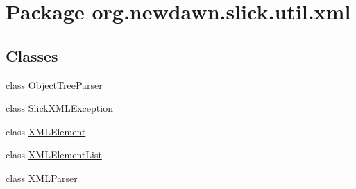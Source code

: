 \hypertarget{namespaceorg_1_1newdawn_1_1slick_1_1util_1_1xml}{}\section{Package org.\+newdawn.\+slick.\+util.\+xml}
\label{namespaceorg_1_1newdawn_1_1slick_1_1util_1_1xml}
\subsection*{Classes}
\begin{DoxyCompactItemize}
\item 
class \mbox{\hyperlink{classorg_1_1newdawn_1_1slick_1_1util_1_1xml_1_1_object_tree_parser}{Object\+Tree\+Parser}}
\item 
class \mbox{\hyperlink{classorg_1_1newdawn_1_1slick_1_1util_1_1xml_1_1_slick_x_m_l_exception}{Slick\+X\+M\+L\+Exception}}
\item 
class \mbox{\hyperlink{classorg_1_1newdawn_1_1slick_1_1util_1_1xml_1_1_x_m_l_element}{X\+M\+L\+Element}}
\item 
class \mbox{\hyperlink{classorg_1_1newdawn_1_1slick_1_1util_1_1xml_1_1_x_m_l_element_list}{X\+M\+L\+Element\+List}}
\item 
class \mbox{\hyperlink{classorg_1_1newdawn_1_1slick_1_1util_1_1xml_1_1_x_m_l_parser}{X\+M\+L\+Parser}}
\end{DoxyCompactItemize}
